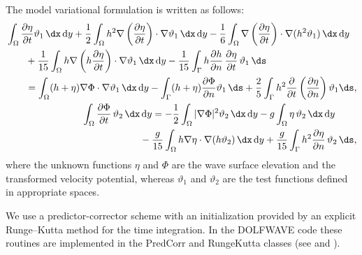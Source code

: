 The model variational formulation is written as follows:
\begin{subequations}
  \label{eq:lopes:varform}
  \begin{align}
    \begin{split}
      &\displaystyle \int_\Omega\frac{\partial \eta}{\partial
        t}\vartheta_1\, \dx\, \mathrm{d}y +\frac{1}{2}\int_\Omega
      h^2\nabla\left(\frac{\partial \eta}{\partial t}\right)
      \cdot\nabla\vartheta_1\, \dx\, \mathrm{d}y-
      \frac{1}{6}\int_\Omega \nabla\left(\frac{\partial \eta}{\partial
          t}\right)\cdot\nabla(h^2\vartheta_1)\, \dx\, \mathrm{d}y\\
      &\quad \quad\displaystyle +
      \frac{1}{15}\int_\Omega
      h\nabla\left(h\frac{\partial \eta}{\partial t}\right)\cdot
      \nabla\vartheta_1\, \dx\, \mathrm{d}y- \frac{1}{15}\int_\Gamma
      h\frac{\partial h}{\partial n}\,\frac{\partial \eta}{\partial
        t}\,\vartheta_1\, \ds
      \\ &\quad\quad=\displaystyle
      \int_\Omega(h+\eta)\nabla\Phi\cdot\nabla\vartheta_1\,
      \dx\, \mathrm{d}y -\int_\Gamma(h+\eta)\frac{\partial
        \Phi}{\partial n}\vartheta_1\, \ds
      +\frac{2}{5}\int_\Gamma
      h^2\frac{\partial }{\partial t}\left(\frac{\partial
          \eta}{\partial n}\right)\vartheta_1 \ds,
    \end{split} \\
    \begin{split}
      &\displaystyle \int_\Omega \frac{\partial \Phi}{\partial
        t}\,\vartheta_2\, \dx\, \mathrm{d}y=
      -\frac{1}{2}\int_\Omega|\nabla\Phi|^2\vartheta_2\, \dx\,
      \mathrm{d}y -g\int_\Omega \eta\,\vartheta_2\, \dx\,
      \mathrm{d}y\\
      &\qquad\qquad\qquad\displaystyle-\frac{g}{15}\int_\Omega
      h\nabla\eta\cdot\nabla(h\vartheta_2)\, \dx\, \mathrm{d}y
      +\frac{g}{15}\int_\Gamma h^2\frac{\partial \eta}{\partial
        n}\,\vartheta_2\, \ds,
    \end{split}
  \end{align}
\end{subequations}
where the unknown functions $\eta$ and $\Phi$ are the wave surface
elevation and the transformed velocity potential, whereas
$\vartheta_1$ and $\vartheta_2$ are the test functions defined in
appropriate spaces.

We use a predictor-corrector  scheme with
an initialization provided by an explicit
Runge--Kutta method for the time integration. In
the DOLFWAVE code these routines are implemented in the PredCorr and
RungeKutta classes (see  and
).

